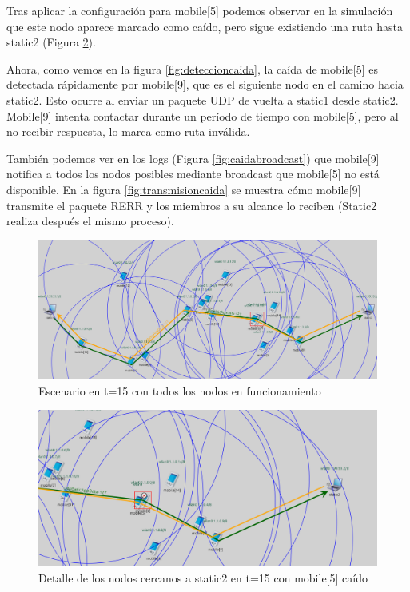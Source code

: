 Tras aplicar la configuración para mobile[5] podemos observar en la simulación que este nodo aparece marcado como caído, pero sigue existiendo una ruta hasta static2 (Figura \ref{fig:nodocaidot15}).

Ahora, como vemos en la figura \ref{fig:deteccioncaida}, la caída de mobile[5] es detectada rápidamente por mobile[9], que es el siguiente nodo en el camino hacia static2. Esto ocurre al enviar un paquete UDP de vuelta a static1 desde static2. Mobile[9] intenta contactar durante un período de tiempo con mobile[5], pero al no recibir respuesta, lo marca como ruta inválida.

También podemos ver en los logs (Figura \ref{fig:caidabroadcast}) que mobile[9] notifica a todos los nodos posibles mediante broadcast que mobile[5] no está disponible. En la figura \ref{fig:transmisioncaida} se muestra cómo mobile[9] transmite el paquete RERR y los miembros a su alcance lo reciben (Static2 realiza después el mismo proceso).

\begin{figure}[H]
    \centering
    \includegraphics[width=125mm, scale=0.75]{imaxes/ejercicio4_1.png}
    \caption{Escenario en t=15 con todos los nodos en funcionamiento}
    \label{fig:escenariot15}
\end{figure}

\begin{figure}[H]
    \centering
    \includegraphics[width=125mm, scale=0.75]{imaxes/ejercicio4_2.png}
    \caption{Detalle de los nodos cercanos a static2 en t=15 con mobile[5] caído}
    \label{fig:nodocaidot15}
\end{figure}

